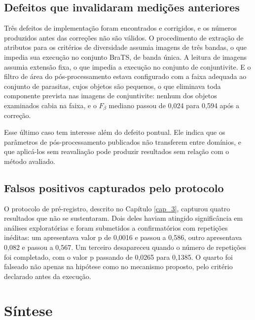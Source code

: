 \subsection{Defeitos que invalidaram medições anteriores}

Três defeitos de implementação foram encontrados e corrigidos, e os números produzidos antes das correções não são válidos. O procedimento de extração de atributos para os critérios de diversidade assumia imagens de três bandas, o que impedia sua execução no conjunto BraTS, de banda única. A leitura de imagens assumia extensão fixa, o que impedia a execução no conjunto de conjuntivite. E o filtro de área do pós-processamento estava configurado com a faixa adequada ao conjunto de parasitas, cujos objetos são pequenos, o que eliminava toda componente prevista nas imagens de conjuntivite: nenhum dos objetos examinados cabia na faixa, e o $F_\beta$ mediano passou de 0,024 para 0,594 após a correção.

Esse último caso tem interesse além do defeito pontual. Ele indica que os parâmetros de pós-processamento publicados não transferem entre domínios, e que aplicá-los sem reavaliação pode produzir resultados sem relação com o método avaliado.

\subsection{Falsos positivos capturados pelo protocolo}

O protocolo de pré-registro, descrito no Capítulo \ref{cap_3}, capturou quatro resultados que não se sustentaram. Dois deles haviam atingido significância em análises exploratórias e foram submetidos a confirmatórios com repetições inéditas: um apresentava valor p de 0,0016 e passou a 0,586, outro apresentava 0,082 e passou a 0,567. Um terceiro desapareceu quando o número de repetições foi completado, com o valor p passando de 0,0265 para 0,1385. O quarto foi falseado não apenas na hipótese como no mecanismo proposto, pelo critério declarado antes da execução.

\begin{table}[htb]
\centering
\caption{Composição do registro de execuções.}
\label{tab_proveniencia}

\end{table}



\section{Síntese}

